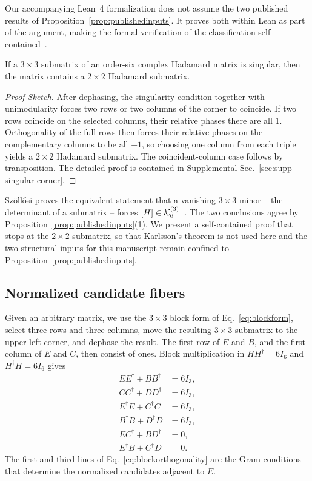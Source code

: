 Our accompanying Lean~4 formalization \cite{CardenesWuttig2026HadamardRepository} does not assume the two published results of Proposition~\ref{prop:publishedinputs}. It proves both within Lean as part of the argument, making the formal verification of the classification self-contained~\cite{CardenesWuttig2026HadamardRepository}.

\begin{lemma}
\label{lem:singularcorner}
If a $3\times3$ submatrix of an order-six complex Hadamard matrix is singular, then the matrix contains a $2\times2$ Hadamard submatrix.
\end{lemma}

\begin{proof}[Proof Sketch]
After dephasing, the singularity condition together with unimodularity forces two rows or two columns of the corner to coincide. If two rows coincide on the selected columns, their relative phases there are all $1$. Orthogonality of the full rows then forces their relative phases on the complementary columns to be all $-1$, so choosing one column from each triple yields a $2\times2$ Hadamard submatrix. The coincident-column case follows by transposition. The detailed proof is contained in Supplemental Sec.~\ref{sec:supp-singular-corner}.
\end{proof}

Sz\"oll\H{o}si proves the equivalent statement that a vanishing $3\times3$ minor -- the determinant of a submatrix -- forces
$[H]\in\mathcal K_6^{(3)}$~\cite{Szollosi2012FourParameter}. The two conclusions agree by Proposition~\ref{prop:publishedinputs}(1).
We present a self-contained proof that stops at the $2\times2$ submatrix, so that Karlsson's theorem is not used here and the two structural inputs for this manuscript remain confined to Proposition~\ref{prop:publishedinputs}.

\subsection{Normalized candidate fibers}
Given an arbitrary matrix, we use the $3\times3$ block form of Eq.~\eqref{eq:blockform}, select three rows and three columns, move the resulting $3\times3$ submatrix to the upper-left corner, and dephase the result.
The first row of $E$ and $B$, and the first column of $E$ and $C$, then consist of ones. Block multiplication in $HH^{\dagger}=6I_6$ and
$H^{\dagger}H=6I_6$ gives
\begin{equation}
\begin{aligned}
EE^{\dagger}+BB^{\dagger}&=6I_3,\\
CC^{\dagger}+DD^{\dagger}&=6I_3,\\
E^{\dagger}E+C^{\dagger}C&=6I_3,\\
B^{\dagger}B+D^{\dagger}D&=6I_3,\\
EC^{\dagger}+BD^{\dagger}&=0,\\
E^{\dagger}B+C^{\dagger}D&=0.
\end{aligned}
\label{eq:blockorthogonality}
\end{equation}
The first and third lines of Eq.~\eqref{eq:blockorthogonality} are the Gram conditions that determine the normalized candidates adjacent to $E$.


